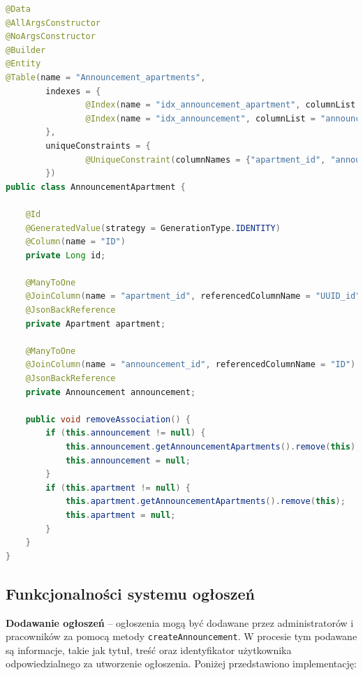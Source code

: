 \begin{lstlisting}[language=Java, style=JavaStyle, caption=Encja \texttt{AnnouncementApartment}]
@Data
@AllArgsConstructor
@NoArgsConstructor
@Builder
@Entity
@Table(name = "Announcement_apartments",
        indexes = {
                @Index(name = "idx_announcement_apartment", columnList = "apartment_id"),
                @Index(name = "idx_announcement", columnList = "announcement_id")
        },
        uniqueConstraints = {
                @UniqueConstraint(columnNames = {"apartment_id", "announcement_id"})
        })
public class AnnouncementApartment {

    @Id
    @GeneratedValue(strategy = GenerationType.IDENTITY)
    @Column(name = "ID")
    private Long id;

    @ManyToOne
    @JoinColumn(name = "apartment_id", referencedColumnName = "UUID_id")
    @JsonBackReference
    private Apartment apartment;

    @ManyToOne
    @JoinColumn(name = "announcement_id", referencedColumnName = "ID")
    @JsonBackReference
    private Announcement announcement;

    public void removeAssociation() {
        if (this.announcement != null) {
            this.announcement.getAnnouncementApartments().remove(this);
            this.announcement = null;
        }
        if (this.apartment != null) {
            this.apartment.getAnnouncementApartments().remove(this);
            this.apartment = null;
        }
    }
}
\end{lstlisting}

\subsection{Funkcjonalności systemu ogłoszeń}

\textbf{Dodawanie ogłoszeń} -- ogłoszenia mogą być dodawane przez administratorów i pracowników za pomocą metody \texttt{createAnnouncement}. W procesie tym podawane są informacje, takie jak tytuł, treść oraz identyfikator użytkownika odpowiedzialnego za utworzenie ogłoszenia. Poniżej przedstawiono implementację:

